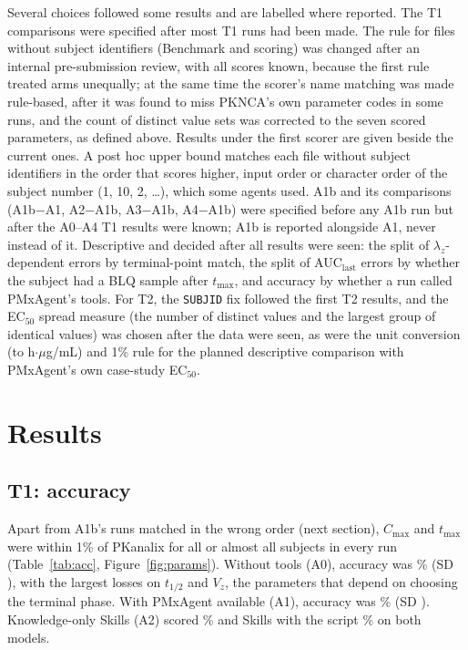\documentclass[11pt]{article}
\begin{document}
Several choices followed some results and are labelled where reported. The T1 comparisons were specified after most T1
runs had been made. The rule for files without subject identifiers (Benchmark and scoring) was changed after an
internal pre-submission review, with all scores known, because the first rule treated arms unequally; at the same time
the scorer's name matching was made rule-based, after it was found to miss PKNCA's own parameter codes in some runs,
and the count of distinct value sets was corrected to the seven scored parameters, as defined above. Results under the
first scorer are given beside the current ones. A post hoc upper bound matches each file without subject identifiers in
the order that scores higher, input order or character order of the subject number (1, 10, 2, \ldots), which some
agents used. A1b and its comparisons (A1b$-$A1, A2$-$A1b, A3$-$A1b, A4$-$A1b) were specified before any A1b run but
after the A0--A4 T1 results were known; A1b is reported alongside A1, never instead of it. Descriptive and decided after
all results were seen: the split of $\lambda_z$-dependent errors by terminal-point match, the split of AUC$_\mathrm{last}$
errors by whether the subject had a BLQ sample after $t_\mathrm{max}$, and accuracy by whether a run called PMxAgent's
tools. For T2, the \texttt{SUBJID} fix followed the first T2 results, and the EC$_{50}$ spread measure (the number of
distinct values and the largest group of identical values) was chosen after the data were seen, as were the unit
conversion (to h$\cdot\mu$g/mL) and 1\% rule for the planned descriptive comparison with PMxAgent's own case-study
EC$_{50}$.

\section{Results}
\subsection{T1: accuracy}
Apart from A1b's runs matched in the wrong order (next section), $C_\mathrm{max}$ and $t_\mathrm{max}$ were within 1\%
of PKanalix for all or almost all subjects in every run (Table~\ref{tab:acc}, Figure~\ref{fig:params}). Without tools
(A0), accuracy was \numToneAzeroAcc\% (SD \numToneAzeroAccSD), with the largest losses on $t_{1/2}$ and $V_z$, the
parameters that depend on choosing the terminal phase. With PMxAgent available (A1), accuracy was \numToneAoneAcc\% (SD
\numToneAoneAccSD). Knowledge-only Skills (A2) scored \numToneAtwoAcc\% and Skills with the script \numToneAthreeAcc\%
on both models.
\end{document}
